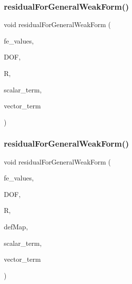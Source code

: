 \subsubsection{\texorpdfstring{residualForGeneralWeakForm()}{residualForGeneralWeakForm()}\hspace{0.1cm}{\footnotesize\ttfamily [1/2]}}
{\footnotesize\ttfamily void residual\+For\+General\+Weak\+Form (\begin{DoxyParamCaption}\item[{const F\+E\+Values$<$ dim $>$ \&}]{fe\+\_\+values,  }\item[{unsigned int}]{D\+OF,  }\item[{dealii\+::\+Table$<$ 1, T $>$ \&}]{R,  }\item[{dealii\+::\+Table$<$ 1, T $>$ \&}]{scalar\+\_\+term,  }\item[{dealii\+::\+Table$<$ 2, T $>$ \&}]{vector\+\_\+term }\end{DoxyParamCaption})}

\mbox{\label{class_residual_a478a5fee7d75f3a16707ad5915a34d3f}} 
\subsubsection{\texorpdfstring{residualForGeneralWeakForm()}{residualForGeneralWeakForm()}\hspace{0.1cm}{\footnotesize\ttfamily [2/2]}}
{\footnotesize\ttfamily void residual\+For\+General\+Weak\+Form (\begin{DoxyParamCaption}\item[{const F\+E\+Values$<$ dim $>$ \&}]{fe\+\_\+values,  }\item[{unsigned int}]{D\+OF,  }\item[{dealii\+::\+Table$<$ 1, T $>$ \&}]{R,  }\item[{\mbox{\hyperlink{structdeformation_map}{deformation\+Map}}$<$ T, dim $>$ \&}]{def\+Map,  }\item[{dealii\+::\+Table$<$ 1, T $>$ \&}]{scalar\+\_\+term,  }\item[{dealii\+::\+Table$<$ 2, T $>$ \&}]{vector\+\_\+term }\end{DoxyParamCaption})}

\mbox{\label{class_residual_a432fe02216f182fd241f09775131f854}} 
